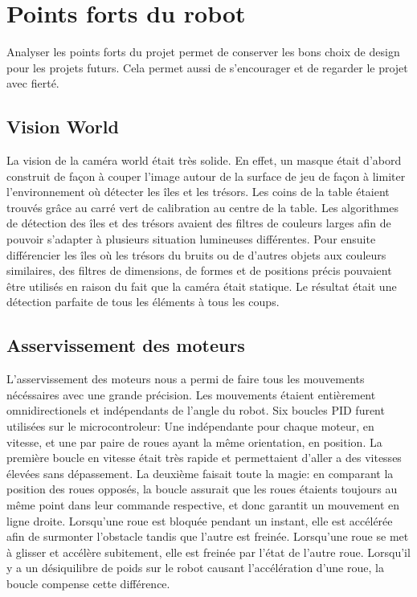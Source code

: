 \section{Points forts du robot}

Analyser les points forts du projet permet de conserver les bons choix de design pour les projets futurs. Cela permet aussi de s'encourager et de regarder le projet avec fierté.

\subsection{Vision World}

La vision de la caméra world était très solide. En effet, un masque était d’abord construit de façon à couper l’image autour de la surface de jeu de façon à limiter l'environnement où détecter les îles et les trésors. Les coins de la table étaient trouvés grâce au carré vert de calibration au centre de la table. Les algorithmes de détection des îles et des trésors avaient des filtres de couleurs larges afin de pouvoir s’adapter à plusieurs situation lumineuses différentes. Pour ensuite différencier les îles où les trésors du bruits ou de d’autres objets aux couleurs similaires, des filtres de dimensions, de formes et de positions précis pouvaient être utilisés en raison du fait que la caméra était statique. Le résultat était une détection parfaite de tous les éléments à tous les coups.

\subsection{Asservissement des moteurs}
L'asservissement des moteurs nous a permi de faire tous les mouvements nécéssaires avec une grande précision. Les mouvements étaient entièrement omnidirectionels et indépendants de l’angle du robot. Six boucles PID furent utilisées sur le microcontroleur: Une indépendante pour chaque moteur, en vitesse, et une par paire de roues ayant la même orientation, en position. La première boucle en vitesse était très rapide et permettaient d’aller a des vitesses élevées sans dépassement. La deuxième faisait toute la magie: en comparant la position des roues opposés, la boucle assurait que les roues étaients toujours au même point dans leur commande respective, et donc garantit un mouvement en ligne droite. Lorsqu’une roue est bloquée pendant un instant, elle est accélérée afin de surmonter l’obstacle tandis que l’autre est freinée. Lorsqu’une roue se met à glisser et accélère subitement, elle est freinée par l’état de l’autre roue. Lorsqu’il y a un désiquilibre de poids sur le robot causant l’accélération d’une roue, la boucle compense cette différence.

